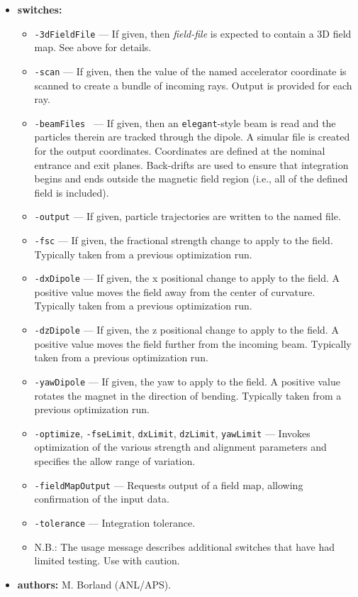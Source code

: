 \documentclass[11pt]{article}
\begin{document}
\begin{itemize}
\item {\bf switches:}
\begin{itemize}
\item {\tt -3dFieldFile} --- If given, then {\em field-file} is expected to contain a 3D field map. See above for details.
\item {\tt -scan} --- If given, then the value of the named accelerator coordinate is scanned to create a bundle of incoming rays. Output is provided for each  ray.
\item {\tt -beamFiles } --- If given, then an {\tt elegant}-style beam is read and the particles therein are tracked through the dipole.
A simular file is created for the output coordinates. Coordinates are defined at the nominal entrance and exit planes. Back-drifts are used to ensure that
integration begins and ends outside the magnetic field region (i.e., all of the defined field is included).
\item {\tt -output} --- If given, particle trajectories are written to the named file.
\item {\tt -fsc} --- If given, the fractional strength change to apply to the field. Typically taken from a previous optimization run.
\item {\tt -dxDipole} --- If given, the x positional change to apply to the field. A positive value moves the field away from the center of curvature.
  Typically taken from a previous optimization run.
\item {\tt -dzDipole} --- If given, the z positional change to apply to the field. A positive value moves the field further from the incoming beam.
Typically taken from a previous optimization run.
\item {\tt -yawDipole} --- If given, the yaw to apply to the field. A positive value rotates the magnet in the direction of bending.
Typically taken from a previous optimization run.
\item {\tt -optimize}, {\tt -fseLimit}, {\tt dxLimit}, {\tt dzLimit}, {\tt yawLimit} --- Invokes optimization of the various strength and alignment
parameters and specifies the allow range of variation.
\item {\tt -fieldMapOutput} --- Requests output of a field map, allowing confirmation of the input data.
\item {\tt -tolerance} --- Integration tolerance.
\item N.B.: The usage message describes additional switches that have had limited testing. Use with caution.
\end{itemize}

\item {\bf authors:} M. Borland (ANL/APS).

\end{itemize}
\end{document}
